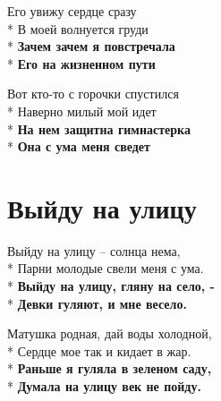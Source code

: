 \medskip

\begin{minipage}{\linewidth}
Его увижу сердце сразу\\*
В моей волнуется груди\\*
\textbf{Зачем зачем я повстречала}\\*
\textbf{Его на жизненном пути}\\
\end{minipage}\par\medskip\nobreak

\medskip

\begin{minipage}{\linewidth}
Вот кто-то с горочки спустился\\*
Наверно милый мой идет\\*
\textbf{На нем защитна гимнастерка}\\*
\textbf{Она с ума меня сведет}\\
\end{minipage}

\vspace{\fill}\newpage

\section{Выйду на улицу}
\label{song:Выйду_на_улицу}

\medskip

\begin{minipage}{\linewidth}
Выйду на улицу – солнца нема,\\*
Парни молодые свели меня с ума.\\*
\textbf{Выйду на улицу, гляну на село, -}\\*
\textbf{Девки гуляют, и мне весело.
}\\
\end{minipage}\par\medskip\nobreak

\medskip

\begin{minipage}{\linewidth}
Матушка родная, дай воды холодной,\\*
Сердце мое так и кидает в жар.\\*
\textbf{Раньше я гуляла в зеленом саду,}\\*
\textbf{Думала на улицу век не пойду.}\\
\end{minipage}\par\medskip\nobreak

